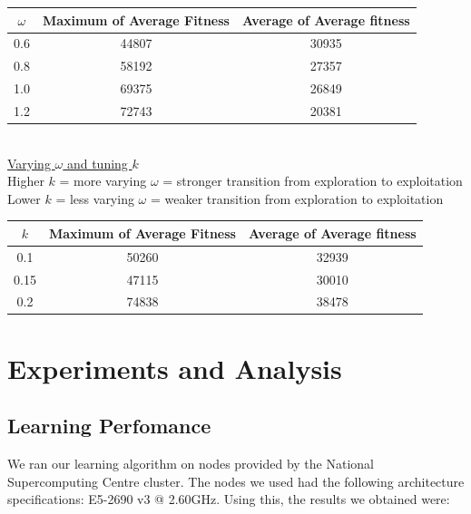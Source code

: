 \documentclass[12pt]{article}
\begin{document}
	\begin{tabular}{ | c | c | c | }
		\hline
		$\omega$ & Maximum of Average Fitness & Average of Average fitness \\ \hline
		0.6 & 44807 & 30935 \\ \hline
		0.8 & 58192 & 27357 \\ \hline
		1.0 & 69375 & 26849 \\ \hline
		1.2 & 72743 & 20381 \\ \hline
	\end{tabular}\\[0.5em]

	\underline{Varying $\omega$ and tuning $k$}\\
	Higher $k$ = more varying $\omega$ = stronger transition from exploration to exploitation\\
	Lower $k$ = less varying $\omega$ = weaker transition from exploration to exploitation\\

	\begin{tabular}{ | c | c | c | }
		\hline
		$k$ & Maximum of Average Fitness & Average of Average fitness \\ \hline
		0.1 & 50260 & 32939 \\ \hline
		0.15 & 47115 & 30010 \\ \hline
		0.2 & 74838 & 38478 \\ \hline
	\end{tabular}

    \section{Experiments and Analysis}

	\subsection{Learning Perfomance}
	We ran our learning algorithm on nodes provided by the National Supercomputing Centre cluster.
	The nodes we used had the following architecture specifications: E5-2690 v3 @ 2.60GHz.
	Using this, the results we obtained were:
\end{document}
